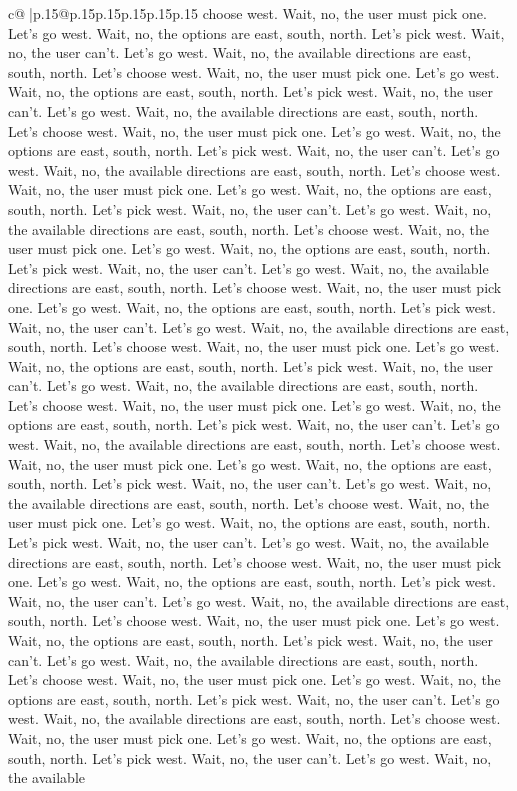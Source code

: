\documentclass{article}
\begin{document}
{\begin{supertabular}{c@{$\;$}|p{.15\linewidth}@{}p{.15\linewidth}p{.15\linewidth}p{.15\linewidth}p{.15\linewidth}p{.15\linewidth}}
{{{choose west. Wait, no, the user must pick one. Let's go west. Wait, no, the options are east, south, north. Let's pick west. Wait, no, the user can't. Let's go west. Wait, no, the available directions are east, south, north. Let's choose west. Wait, no, the user must pick one. Let's go west. Wait, no, the options are east, south, north. Let's pick west. Wait, no, the user can't. Let's go west. Wait, no, the available directions are east, south, north. Let's choose west. Wait, no, the user must pick one. Let's go west. Wait, no, the options are east, south, north. Let's pick west. Wait, no, the user can't. Let's go west. Wait, no, the available directions are east, south, north. Let's choose west. Wait, no, the user must pick one. Let's go west. Wait, no, the options are east, south, north. Let's pick west. Wait, no, the user can't. Let's go west. Wait, no, the available directions are east, south, north. Let's choose west. Wait, no, the user must pick one. Let's go west. Wait, no, the options are east, south, north. Let's pick west. Wait, no, the user can't. Let's go west. Wait, no, the available directions are east, south, north. Let's choose west. Wait, no, the user must pick one. Let's go west. Wait, no, the options are east, south, north. Let's pick west. Wait, no, the user can't. Let's go west. Wait, no, the available directions are east, south, north. Let's choose west. Wait, no, the user must pick one. Let's go west. Wait, no, the options are east, south, north. Let's pick west. Wait, no, the user can't. Let's go west. Wait, no, the available directions are east, south, north. Let's choose west. Wait, no, the user must pick one. Let's go west. Wait, no, the options are east, south, north. Let's pick west. Wait, no, the user can't. Let's go west. Wait, no, the available directions are east, south, north. Let's choose west. Wait, no, the user must pick one. Let's go west. Wait, no, the options are east, south, north. Let's pick west. Wait, no, the user can't. Let's go west. Wait, no, the available directions are east, south, north. Let's choose west. Wait, no, the user must pick one. Let's go west. Wait, no, the options are east, south, north. Let's pick west. Wait, no, the user can't. Let's go west. Wait, no, the available directions are east, south, north. Let's choose west. Wait, no, the user must pick one. Let's go west. Wait, no, the options are east, south, north. Let's pick west. Wait, no, the user can't. Let's go west. Wait, no, the available directions are east, south, north. Let's choose west. Wait, no, the user must pick one. Let's go west. Wait, no, the options are east, south, north. Let's pick west. Wait, no, the user can't. Let's go west. Wait, no, the available directions are east, south, north. Let's choose west. Wait, no, the user must pick one. Let's go west. Wait, no, the options are east, south, north. Let's pick west. Wait, no, the user can't. Let's go west. Wait, no, the available directions are east, south, north. Let's choose west. Wait, no, the user must pick one. Let's go west. Wait, no, the options are east, south, north. Let's pick west. Wait, no, the user can't. Let's go west. Wait, no, the available }}}
\end{supertabular}}
\end{document}
